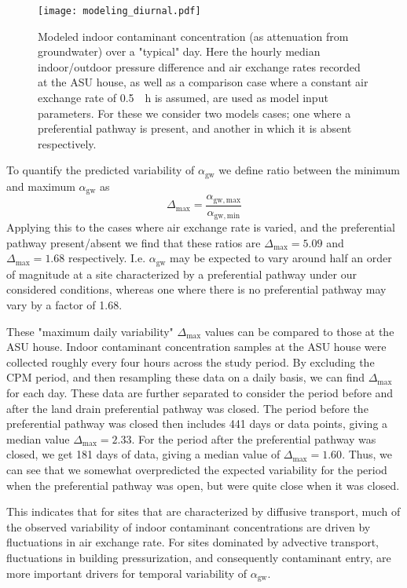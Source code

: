 \begin{figure}[htb!]
  \centering
  \texttt{[image: modeling\_diurnal.pdf]}
  \caption[Predicted indoor contaminant concentration using diurnal building pressurization and air exchange rates as inputs.]{Modeled indoor contaminant concentration (as attenuation from groundwater) over a "typical" day. Here the hourly median indoor/outdoor pressure difference and air exchange rates recorded at the ASU house, as well as a comparison case where a constant air exchange rate of \SI{0.5}{\per\hour} is assumed, are used as model input parameters. For these we consider two models cases; one where a preferential pathway is present, and another in which it is absent respectively.}
  \label{fig:model_diurnal}
\end{figure}

To quantify the predicted variability of $\alpha_\mathrm{gw}$ we define ratio between the minimum and maximum $\alpha_\mathrm{gw}$ as
\begin{equation}
  \Delta_\mathrm{max} = \frac{\alpha_\mathrm{gw,max}}{\alpha_\mathrm{gw,min}}
\end{equation}
Applying this to the cases where air exchange rate is varied, and the preferential pathway present/absent we find that these ratios are $\Delta_\mathrm{max} = 5.09$ and $\Delta_\mathrm{max} = 1.68$ respectively.
I.e. $\alpha_\mathrm{gw}$ may be expected to vary around half an order of magnitude at a site characterized by a preferential pathway under our considered conditions, whereas one where there is no preferential pathway may vary by a factor of 1.68.\par

These "maximum daily variability" $\Delta_\mathrm{max}$ values can be compared to those at the ASU house.
Indoor contaminant concentration samples at the ASU house were collected roughly every four hours across the study period.
By excluding the CPM period, and then resampling these data on a daily basis, we can find $\Delta_\mathrm{max}$ for each day.
These data are further separated to consider the period before and after the land drain preferential pathway was closed.
The period before the preferential pathway was closed then includes 441 days or data points, giving a median value $\Delta_\mathrm{max} = 2.33$.
For the period after the preferential pathway was closed, we get 181 days of data, giving a median value of $\Delta_\mathrm{max} = 1.60$.
Thus, we can see that we somewhat overpredicted the expected variability for the period when the preferential pathway was open, but were quite close when it was closed.\par

This indicates that for sites that are characterized by diffusive transport, much of the observed variability of indoor contaminant concentrations are driven by fluctuations in air exchange rate.
For sites dominated by advective transport, fluctuations in building pressurization, and consequently contaminant entry, are more important drivers for temporal variability of $\alpha_\mathrm{gw}$.\par
